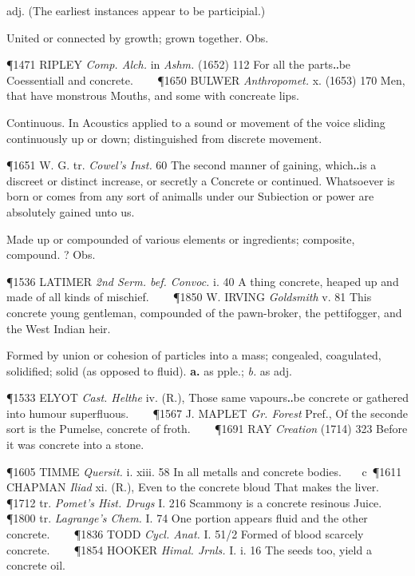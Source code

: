 \begin{description}[wide, labelwidth=!, labelindent=0pt]
\begin{myenumerate}

 adj. (The earliest instances appear to be participial.)

  United or connected by growth; grown together. Obs.

\P 1471 RIPLEY  \textit{Comp. Alch.} in \textit{Ashm.} (1652) 112 For all the parts‥be Coessentiall and concrete.    
\P 1650 BULWER  \textit{Anthropomet.} x. (1653) 170 Men, that have monstrous Mouths, and some with concreate lips.

 Continuous. In Acoustics applied to a sound or movement of the voice sliding continuously up or down; distinguished from discrete movement.

\P 1651 W. G. tr.  \textit{Cowel's Inst.} 60 The second manner of gaining, which‥is a discreet or distinct increase, or secretly a Concrete or continued. Whatsoever is born or comes from any sort of animalls under our Subiection or power are absolutely gained unto us.

 Made up or compounded of various elements or ingredients; composite, compound. ? Obs.

\P 1536 LATIMER  \textit{2nd Serm. bef. Convoc.} i. 40 A thing concrete, heaped up and made of all kinds of mischief.    
\P 1850 W. IRVING  \textit{Goldsmith} v. 81 This concrete young gentleman, compounded of the pawn-broker, the pettifogger, and the West Indian heir.

 Formed by union or cohesion of particles into a mass; congealed, coagulated, solidified; solid (as opposed to fluid). \textbf{a.} as pple.; \textit{b.} as adj.

\P 1533 ELYOT  \textit{Cast. Helthe} iv. (R.), Those same vapours‥be concrete or gathered into humour superfluous.    
\P 1567 J. MAPLET  \textit{Gr. Forest} Pref., Of the seconde sort is the Pumelse, concrete of froth.    
\P 1691 RAY  \textit{Creation} (1714) 323 Before it was concrete into a stone.

\P 1605 TIMME  \textit{Quersit.} i. xiii. 58 In all metalls and concrete bodies.    c 
\P 1611 CHAPMAN  \textit{Iliad} xi. (R.), Even to the concrete bloud That makes the liver.    
\P 1712 tr. \textit{Pomet's Hist. Drugs} I. 216 Scammony is a concrete resinous Juice.    
\P 1800 tr. \textit{Lagrange's Chem.} I. 74 One portion appears fluid and the other concrete.    
\P 1836 TODD  \textit{Cycl. Anat.} I. 51/2 Formed of blood scarcely concrete.    
\P 1854 HOOKER  \textit{Himal. Jrnls.} I. i. 16 The seeds too, yield a concrete oil.


\end{myenumerate}
\end{description}
